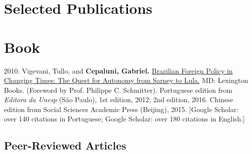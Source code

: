 \documentclass[a4paper,11.5pt]{article}
\renewenvironment{itemize}{
	\begin{list}{}{
			\setlength{\leftmargin}{1.5em}
		}
		}{
	\end{list}
}
\begin{document}
\section*{Selected Publications}

\section*{Book}

\begin{itemize}
	\item 2010. Vigevani, Tullo, and \textbf{Cepaluni, Gabriel.} \href{https://www.google.com.br/books/edition/Brazilian_Foreign_Policy_in_Changing_Tim/A2AmOQpQPYcC?hl=pt-BR&gbpv=1&dq=Brazilian+Foreign+Policy&printsec=frontcover}{Brazilian Foreign Policy in Changing Times: The Quest for Autonomy from Sarney to Lula.} MD: Lexington Books. (Foreword by Prof. Philippe C. Schmitter). Portuguese edition from \emph{Editora da Unesp} (São Paulo), 1st edition, 2012; 2nd edition, 2016. Chinese edition from Social Sciences Academic Press (Beijing), 2015. [Google Scholar: over 140 citations in Portuguese; Google Scholar: over 180 citations in English.]
\end{itemize}

\subsection*{Peer-Reviewed Articles}
\end{document}
